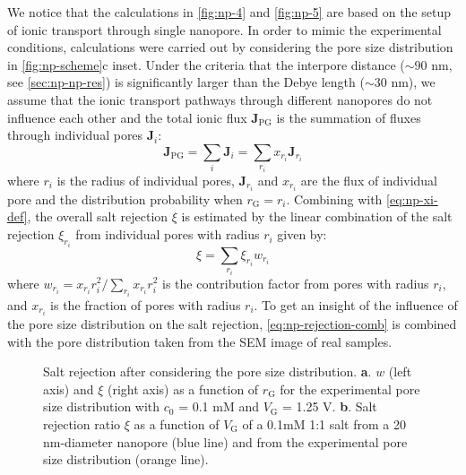 We notice that the calculations in \autoref{fig:np-4} and
\autoref{fig:np-5} are based on the setup of ionic transport through
single nanopore.  In order to mimic the experimental conditions,
calculations were carried out by considering the pore size
distribution in  \autoref{fig:np-scheme}c inset.  Under the
criteria that the inter\-pore distance ($\sim{}90$ nm, see
\autoref{sec:np-np-res}) is significantly larger than the Debye length
($\sim{}30$ nm), we assume that the ionic transport pathways through
different nanopores do not influence each other and the total ionic
flux $\symbf{J}_{\mathrm{PG}}$ is the summation of fluxes through
individual pores $\symbf{J}_{i}$:
\begin{equation}
\label{eq:np-J-total}
\symbf{J}_{\mathrm{PG}} = \sum_{i} \symbf{J}_{i} = \sum_{r_{i}} x_{r_{i}} \symbf{J}_{r_{i}}
\end{equation}
where $r_{i}$ is the radius of individual pores,
$\symbf{J}_{r_{i}}$ and $x_{r_{i}}$ are the flux of individual
pore and the distribution probability when
$r_{\mathrm{G}} = r_{i}$.
%
Combining with \autoref{eq:np-xi-def}, the overall salt rejection
$\xi$ is estimated by the linear combination of the salt rejection
$\xi_{r_i}$ from individual pores with radius $r_i$ given by:
\begin{equation}
\label{eq:np-rejection-comb}
\xi = \sum_{r_{i}} \xi_{r_{i}} w_{r_{i}}
\end{equation}
where
$w_{r_{i}} = x_{r_{i}} r_{i}^{2} / \sum_{r_{i}} x_{r_{i}} r_{i}^{2} $
is the contribution factor from pores with radius $r_{i}$, and
$x_{r_{i}}$ is the fraction of pores with radius $r_{i}$.
%
To get an insight of the influence of the pore size distribution on
the salt rejection, \autoref{eq:np-rejection-comb} is combined with 
the pore distribution taken from the SEM image of real samples.
%
\begin{figure}[!htbp]
  \centering
   \caption{Salt rejection after considering the pore size
     distribution. \textbf{a}. $w$ (left axis) and $\xi$ (right axis)
     as a function of $r_{\mathrm{G}}$ for the experimental pore size
     distribution with $c_{0}$ = 0.1 mM and $V_{\mathrm{G}}$ = 1.25 V.
     \textbf{b}. Salt rejection ratio $\xi$ as a function of $V_{\mathrm{G}}$ of a
     0.1mM 1:1 salt from a 20 nm-diameter nanopore (blue line) and
     from the experimental pore size distribution (orange line).}
  \label{fig:np-simple-rect-pore}
\end{figure}


